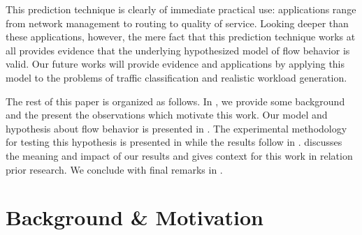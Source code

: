 \documentclass[conference]{IEEEtran}
\begin{document}
This prediction technique is clearly of immediate practical use:
applications range from network management to routing to quality of service.
Looking deeper than these applications, however, the mere fact that this prediction technique works at all provides evidence that the underlying hypothesized model of flow behavior is valid.
Our future works will provide evidence and applications by applying this model to the problems of traffic classification and realistic workload generation.

The rest of this paper is organized as follows.
In , we provide some background and the present the observations which motivate this work.
Our model and hypothesis about flow behavior is presented in .
The experimental methodology for testing this hypothesis is presented in  while the results follow in .
 discusses the meaning and impact of our results and
 gives context for this work in relation prior research.
We conclude with final remarks in .

\section{Background \& Motivation}
\end{document}
